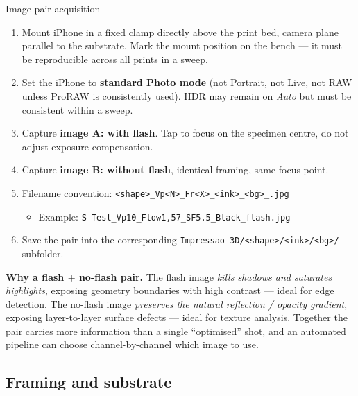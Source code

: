 \documentclass[11pt,a4paper]{article}
\begin{document}
\begin{stepbox}{Image pair acquisition}
\begin{enumerate}[leftmargin=1.4em,itemsep=2pt]
\item Mount iPhone in a fixed clamp directly above the print bed,
camera plane parallel to the substrate. Mark the mount position
on the bench --- it must be reproducible across all prints in a
sweep.
\item Set the iPhone to \textbf{standard Photo mode} (not Portrait,
not Live, not RAW unless ProRAW is consistently used). HDR may
remain on \emph{Auto} but must be consistent within a sweep.
\item Capture \textbf{image A: with flash}. Tap to focus on the
specimen centre, do not adjust exposure compensation.
\item Capture \textbf{image B: without flash}, identical framing,
same focus point.
\item Filename convention:
\texttt{<shape>\_Vp<N>\_Fr<X>\_<ink>\_<bg>\_<flash|noflash>.jpg}
\begin{itemize}[leftmargin=1.4em]
\item Example:
\texttt{S-Test\_Vp10\_Flow1,57\_SF5.5\_Black\_flash.jpg}
\end{itemize}
\item Save the pair into the corresponding
\texttt{Impressao 3D/<shape>/<ink>/<bg>/} subfolder.
\end{enumerate}
\end{stepbox}

\begin{keybox}
\textbf{Why a flash $+$ no-flash pair.} The flash image
\emph{kills shadows and saturates highlights}, exposing geometry
boundaries with high contrast --- ideal for edge detection. The
no-flash image \emph{preserves the natural reflection / opacity
gradient}, exposing layer-to-layer surface defects --- ideal for
texture analysis. Together the pair carries more information
than a single ``optimised'' shot, and an automated pipeline can
choose channel-by-channel which image to use.
\end{keybox}

\subsection{Framing and substrate}
\end{document}
